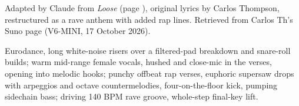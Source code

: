 
\label{sec:loose-rave}
\begin{notes}
Adapted by Claude from \emph{Loose} (page \pageref{sec:loose}), original lyrics by Carlos Thompson, restructured as a rave anthem with added rap lines. Retrieved from Carlos Th's Suno page (V6-MINI, 17 October 2026).
\end{notes}
\begin{style}
Eurodance, long white-noise risers over a filtered-pad breakdown and snare-roll builds; warm mid-range female vocals, hushed and close-mic in the verses, opening into melodic hooks; punchy offbeat rap verses, euphoric supersaw drops with arpeggios and octave countermelodies, four-on-the-floor kick, pumping sidechain bass; driving 140 BPM rave groove, whole-step final-key lift.
\end{style}
